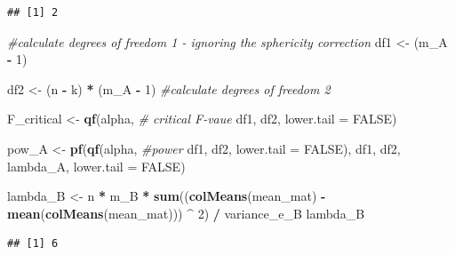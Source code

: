 \documentclass[]{book}
\newenvironment{Shaded}{\begin{snugshade}}{\end{snugshade}}
\newcommand{\CommentTok}[1]{\textcolor[rgb]{0.56,0.35,0.01}{\textit{#1}}}
\newcommand{\DataTypeTok}[1]{\textcolor[rgb]{0.13,0.29,0.53}{#1}}
\newcommand{\DecValTok}[1]{\textcolor[rgb]{0.00,0.00,0.81}{#1}}
\newcommand{\KeywordTok}[1]{\textcolor[rgb]{0.13,0.29,0.53}{\textbf{#1}}}
\newcommand{\NormalTok}[1]{#1}
\newcommand{\OperatorTok}[1]{\textcolor[rgb]{0.81,0.36,0.00}{\textbf{#1}}}
\newcommand{\OtherTok}[1]{\textcolor[rgb]{0.56,0.35,0.01}{#1}}
\newcommand{\StringTok}[1]{\textcolor[rgb]{0.31,0.60,0.02}{#1}}
\begin{document}
\begin{verbatim}
## [1] 2
\end{verbatim}

\begin{Shaded}
\begin{Highlighting}[]
\CommentTok{#calculate degrees of freedom 1 - ignoring the sphericity correction}
\NormalTok{df1 <-}\StringTok{ }\NormalTok{(m_A }\OperatorTok{-}\StringTok{ }\DecValTok{1}\NormalTok{) }

\NormalTok{df2 <-}\StringTok{ }\NormalTok{(n }\OperatorTok{-}\StringTok{ }\NormalTok{k) }\OperatorTok{*}\StringTok{ }\NormalTok{(m_A }\OperatorTok{-}\StringTok{ }\DecValTok{1}\NormalTok{) }\CommentTok{#calculate degrees of freedom 2}

\NormalTok{F_critical <-}\StringTok{ }\KeywordTok{qf}\NormalTok{(alpha, }\CommentTok{# critical F-vaue}
\NormalTok{                 df1,}
\NormalTok{                 df2, }
                 \DataTypeTok{lower.tail =} \OtherTok{FALSE}\NormalTok{) }

\NormalTok{pow_A <-}\StringTok{ }\KeywordTok{pf}\NormalTok{(}\KeywordTok{qf}\NormalTok{(alpha, }\CommentTok{#power }
\NormalTok{             df1, }
\NormalTok{             df2, }
             \DataTypeTok{lower.tail =} \OtherTok{FALSE}\NormalTok{), }
\NormalTok{          df1, }
\NormalTok{          df2, }
\NormalTok{          lambda_A, }
          \DataTypeTok{lower.tail =} \OtherTok{FALSE}\NormalTok{)}

\NormalTok{lambda_B <-}
\StringTok{  }\NormalTok{n }\OperatorTok{*}\StringTok{ }\NormalTok{m_B }\OperatorTok{*}\StringTok{ }\KeywordTok{sum}\NormalTok{((}\KeywordTok{colMeans}\NormalTok{(mean_mat) }\OperatorTok{-}\StringTok{ }
\StringTok{                   }\KeywordTok{mean}\NormalTok{(}\KeywordTok{colMeans}\NormalTok{(mean_mat))) }\OperatorTok{^}\StringTok{ }\DecValTok{2}\NormalTok{) }\OperatorTok{/}\StringTok{ }\NormalTok{variance_e_B }
\NormalTok{lambda_B}
\end{Highlighting}
\end{Shaded}

\begin{verbatim}
## [1] 6
\end{verbatim}
\end{document}
